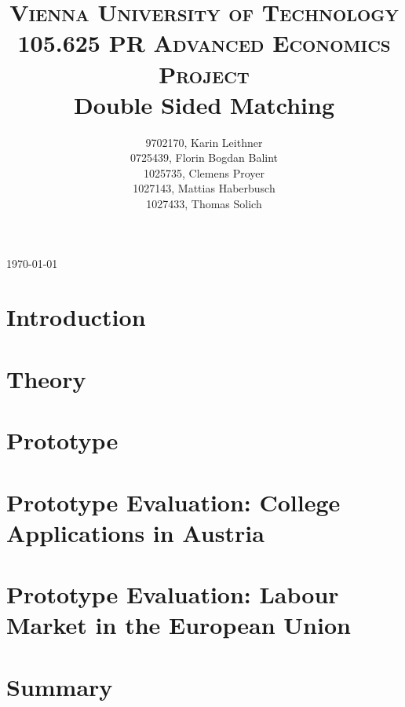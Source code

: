 \documentclass[11pt,english]{article}
\title{
	\usefont{OT1}{bch}{b}{n}
	\normalfont \normalsize \textsc{Vienna University of Technology} \\ [25pt]
	\normalfont \normalsize \textsc{105.625 PR Advanced Economics Project} \\ [25pt]
	\huge Double Sided Matching
}
\author{
  9702170, Karin Leithner\\
  0725439, Florin Bogdan Balint\\
  1025735, Clemens Proyer\\
  1027143, Mattias Haberbusch\\
  1027433, Thomas Solich\\
}
\numberwithin{equation}{section}%
\numberwithin{figure}{section}%
\numberwithin{table}{section}%
\begin{document}
\begin{titlepage}
	\begin{center}
		\thetitle
		\vspace{2cm}
	\end{center}
	\begin{flushleft}
	\vfill
	\theauthor
	\end{flushleft}
	\begin{center}
		\vspace{2cm}
		{\large \today\par}
	\end{center}
\end{titlepage}

\setlength{\cftbeforesecskip}{9pt}
\tableofcontents

\newpage

\section{Introduction}


\section{Theory}


\section{Prototype}


\section{Prototype Evaluation: College Applications in Austria}


\section{Prototype Evaluation: Labour Market in the European Union}


\section{Summary}




\newpage



\end{document}
